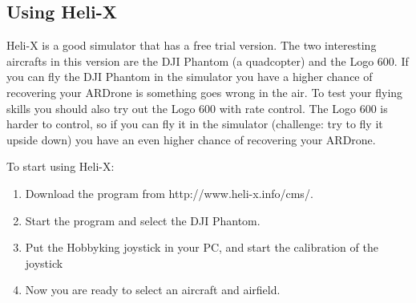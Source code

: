 \documentclass{article}
\begin{document}
\subsection*{Using Heli-X}
Heli-X is a good simulator that has a free trial version. The two interesting aircrafts in this version are the DJI Phantom (a quadcopter) and the Logo 600. If you can fly the DJI Phantom in the simulator you have a higher chance of recovering your ARDrone is something goes wrong in the air. To test your flying skills you should also try out the Logo 600 with rate control. The Logo 600 is harder to control, so if you can fly it in the simulator (challenge: try to fly it upside down) you have an even higher chance of recovering your ARDrone. 
 
To start using Heli-X:
\begin{enumerate}
\item Download the program from http://www.heli-x.info/cms/. 
\item Start the program and select the DJI Phantom.
\item Put the Hobbyking joystick in your PC, and start the calibration of the joystick
\item Now you are ready to select an aircraft and airfield. 
\end{enumerate}
\end{document}
